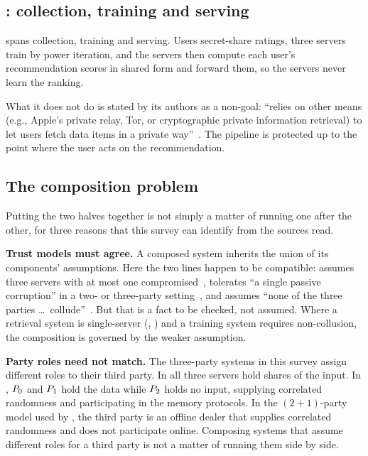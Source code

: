 \subsection{\nudgeplain{}: collection, training and serving}
\label{sec:both:nudge}

\nudge{} spans collection, training and serving. Users secret-share ratings, three servers train
by power iteration, and the servers then compute each user's recommendation scores in shared form
and forward them, so the servers never learn the ranking.

What it does not do is stated by its authors as a non-goal: \nudgeplain{} ``relies on other means
(e.g., Apple's private relay, Tor, or cryptographic private information retrieval) to let users
fetch data items in a private way''~\cite{nudge2026}. The pipeline is protected up to the point
where the user acts on the recommendation.

\subsection{The composition problem}
\label{sec:both:composition}

Putting the two halves together is not simply a matter of running one after the other, for three
reasons that this survey can identify from the sources read.

\textbf{Trust models must agree.} A composed system inherits the union of its components'
assumptions. Here the two lines happen to be compatible: \nudgeplain{} assumes three servers
with at most one compromised~\cite{nudge2026}, \duoramplain{} tolerates ``a single passive
corruption'' in a two- or three-party setting~\cite{duoram2023}, and \pracplain{} assumes ``none
of the three parties \dots\ collude''~\cite{prac2024}. But that is a fact to be checked, not
assumed. Where a retrieval system is single-server (\tiptoeplain{}, \panther{}) and a training
system requires non-collusion, the composition is governed by the weaker assumption.

\textbf{Party roles need not match.} The three-party systems in this survey assign different roles
to their third party. In \nudgeplain{} all three servers hold shares of the input. In
\pracplain{}, $P_{0}$ and $P_{1}$ hold the data while $P_{2}$ holds no input,
supplying correlated randomness and participating in the memory protocols. In the
$(2{+}1)$-party model used by \grottoplain{}, the third party is an offline dealer that supplies
correlated randomness and does not participate online. Composing systems that assume different
roles for a third party is not a matter of running them side by side.

